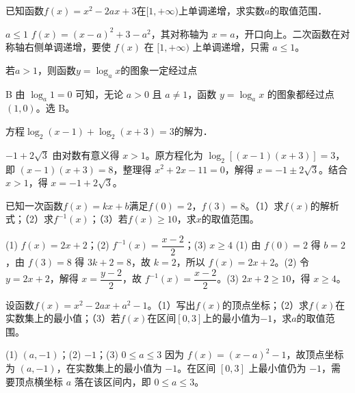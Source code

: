 \begin{question}[GPT生成]
已知函数$f(x)=x^2-2ax+3$在$[1,+\infty)$上单调递增，求实数$a$的取值范围．
\end{question}
\begin{answer}{$a\le1$}
$f(x)=(x-a)^2+3-a^2$，其对称轴为 $x=a$，开口向上。二次函数在对称轴右侧单调递增，要使 $f(x)$ 在 $[1,+\infty)$ 上单调递增，只需 $a\le1$。
\end{answer}



\begin{question}[GPT生成]
若$a>1$，则函数$y=\log_a x$的图象一定经过点\choiceBox
{}
\end{question}
\begin{answer}{B}
由 $\log_a1=0$ 可知，无论 $a>0$ 且 $a\ne1$，函数 $y=\log_a x$ 的图象都经过点 $(1,0)$。选 B。
\end{answer}


\begin{question}[GPT生成]
方程$\log_2(x-1)+\log_2(x+3)=3$的解为\blank{3cm}．
\end{question}
\begin{answer}{$-1+2\sqrt3$}
由对数有意义得 $x>1$。原方程化为 $\log_2[(x-1)(x+3)]=3$，即 $(x-1)(x+3)=8$，整理得 $x^2+2x-11=0$，解得 $x=-1\pm2\sqrt3$。结合 $x>1$，得 $x=-1+2\sqrt3$。
\end{answer}



\begin{question}[GPT生成]
已知一次函数$f(x)=kx+b$满足$f(0)=2$，$f(3)=8$。（1）求$f(x)$的解析式；（2）求$f^{-1}(x)$；（3）若$f(x)\ge10$，求$x$的取值范围。
\end{question}
\solutionSpace{5cm}
\begin{answer}{(1) $f(x)=2x+2$；(2) $f^{-1}(x)=\dfrac{x-2}{2}$；(3) $x\ge4$}
(1) 由 $f(0)=2$ 得 $b=2$，由 $f(3)=8$ 得 $3k+2=8$，故 $k=2$，所以 $f(x)=2x+2$。(2) 令 $y=2x+2$，解得 $x=\dfrac{y-2}{2}$，故 $f^{-1}(x)=\dfrac{x-2}{2}$。(3) $2x+2\ge10$，得 $x\ge4$。
\end{answer}

\begin{question}[GPT生成]
设函数$f(x)=x^2-2ax+a^2-1$。（1）写出$f(x)$的顶点坐标；（2）求$f(x)$在实数集上的最小值；（3）若$f(x)$在区间$[0,3]$上的最小值为$-1$，求$a$的取值范围。
\end{question}
\solutionSpace{5cm}
\begin{answer}{(1) $(a,-1)$；(2) $-1$；(3) $0\le a\le3$}
因为 $f(x)=(x-a)^2-1$，故顶点坐标为 $(a,-1)$，在实数集上的最小值为 $-1$。在区间 $[0,3]$ 上最小值仍为 $-1$，需要顶点横坐标 $a$ 落在该区间内，即 $0\le a\le3$。
\end{answer}

\printChapterAnswers
